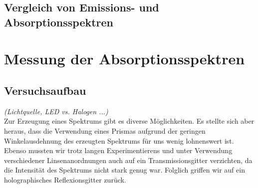 \documentclass[11pt]{scrartcl}
\begin{document}
\subsection{Vergleich von Emissions- und Absorptionsspektren}


\section{Messung der Absorptionsspektren}

\subsection{Versuchsaufbau}
\textit{(Lichtquelle, LED vs. Halogen ...)}\\  %
Zur Erzeugung eines Spektrums gibt es diverse Möglichkeiten. Es stellte sich aber heraus, dass die Verwendung eines Prismas aufgrund der geringen Winkelausdehnung des erzeugten Spektrums für uns wenig lohnenswert ist. Ebenso mussten wir trotz langen Experimentierens und unter Verwendung verschiedener Linsenanordnungen auch auf ein Transmissionsgitter verzichten, da die Intensität des Spektrums nicht stark genug war. Folglich griffen wir auf ein holographisches Reflexionsgitter zurück.\\%
\end{document}
